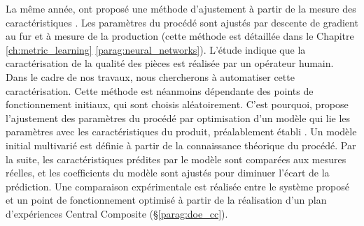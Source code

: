 La même année, \citeauthor{ivester_automatic_1998} ont proposé une méthode d'ajustement à partir de la mesure des caractéristiques \cite{ivester_automatic_1998}.  %
Les paramètres du procédé sont ajustés par descente de gradient au fur et à mesure de la production (cette méthode est détaillée dans le Chapitre \ref{ch:metric_learning} \ref{parag:neural_networks}).
L'étude indique que la caractérisation de la qualité des pièces est réalisée par un opérateur humain.
Dans le cadre de nos travaux, nous chercherons à automatiser cette caractérisation.
Cette méthode est néanmoins dépendante des points de fonctionnement initiaux, qui sont choisis aléatoirement.
C’est pourquoi, \citeauthor{yang_knowledgebased_2000} propose l'ajustement des paramètres du procédé par optimisation d'un modèle qui lie les paramètres avec les caractéristiques du produit, préalablement établi \cite{yang_knowledgebased_2000}.
Un modèle initial multivarié est définie à partir de la connaissance théorique du procédé.
Par la suite, les caractéristiques prédites par le modèle sont comparées aux mesures réelles, et les coefficients du modèle sont ajustés pour diminuer l'écart de la prédiction.
Une comparaison expérimentale est réalisée entre le système proposé et un point de fonctionnement optimisé à partir de la réalisation d'un plan d'expériences Central Composite (§\ref{parag:doe_cc}).

